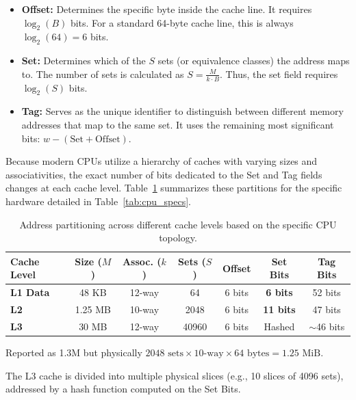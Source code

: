 \begin{appendices}
\begin{itemize}
    \item \textbf{Offset:} Determines the specific byte inside the cache line. It requires $\log_2(B)$ bits. For a standard 64-byte cache line, this is always $\log_2(64) = 6$ bits.
    \item \textbf{Set:} Determines which of the $S$ sets (or equivalence classes) the address maps to. The number of sets is calculated as $S = \frac{M}{k \cdot B}$. Thus, the set field requires $\log_2(S)$ bits.
    \item \textbf{Tag:} Serves as the unique identifier to distinguish between different memory addresses that map to the same set. It uses the remaining most significant bits: $w - (\text{Set} + \text{Offset})$.
\end{itemize}

Because modern CPUs utilize a hierarchy of caches with varying sizes and associativities, the exact number of bits dedicated to the Set and Tag fields changes at each cache level. Table~\ref{tab:cache_partitioning} summarizes these partitions for the specific hardware detailed in Table~\ref{tab:cpu_specs}.

\begin{table}[H]
\centering
\begin{threeparttable}
\caption{Address partitioning across different cache levels based on the specific CPU topology.}
\label{tab:cache_partitioning}
\begin{tabular}{l c c c c c c}
\hline
\textbf{Cache Level} & \textbf{Size ($M$)} & \textbf{Assoc. ($k$)} & \textbf{Sets ($S$)} & \textbf{Offset} & \textbf{Set Bits} & \textbf{Tag Bits} \\ 
\hline
\textbf{L1 Data} & 48 KB & 12-way & 64 & 6 bits & \textbf{6 bits} & 52 bits \\ 
\textbf{L2} & 1.25 MB\tnote{1} & 10-way & 2048 & 6 bits &  \textbf{11 bits} & 47 bits \\ 
\textbf{L3} & 30 MB & 12-way & 40960 & 6 bits & Hashed\tnote{2} & $\sim$46 bits \\ 
\hline
\end{tabular}

\begin{tablenotes}
    \footnotesize 
    \item[1] Reported as 1.3M but physically $2048 \text{ sets} \times 10\text{-way} \times 64 \text{ bytes} = 1.25 \text{ MiB}$.
    \item[2] The L3 cache is divided into multiple physical slices (e.g., 10 slices of 4096 sets), addressed by a hash function computed on the Set Bits.
\end{tablenotes}
\end{threeparttable}
\end{table}



\end{appendices}
